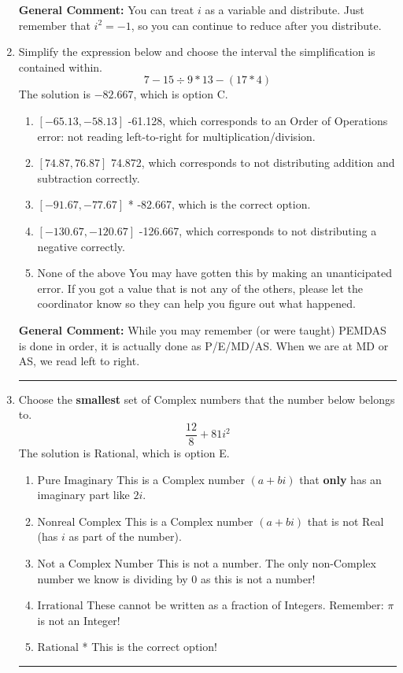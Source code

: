 \documentclass{extbook}[14pt]
\newcommand{\litem}[1]{\item #1

\rule{\textwidth}{0.4pt}}
\begin{document}
\begin{enumerate}
{\textbf{General Comment:} You can treat $i$ as a variable and distribute. Just remember that $i^2=-1$, so you can continue to reduce after you distribute.
}
\litem{
Simplify the expression below and choose the interval the simplification is contained within.
\[ 7 - 15 \div 9 * 13 - (17 * 4) \]
The solution is \( -82.667 \), which is option C.\begin{enumerate}[label=\Alph*.]
\item \( [-65.13, -58.13] \)
 -61.128, which corresponds to an Order of Operations error: not reading left-to-right for multiplication/division.
\item \( [74.87, 76.87] \)
 74.872, which corresponds to not distributing addition and subtraction correctly.
\item \( [-91.67, -77.67] \)
* -82.667, which is the correct option.
\item \( [-130.67, -120.67] \)
 -126.667, which corresponds to not distributing a negative correctly.
\item \( \text{None of the above} \)
 You may have gotten this by making an unanticipated error. If you got a value that is not any of the others, please let the coordinator know so they can help you figure out what happened.
\end{enumerate}

\textbf{General Comment:} While you may remember (or were taught) PEMDAS is done in order, it is actually done as P/E/MD/AS. When we are at MD or AS, we read left to right.
}
\litem{
Choose the \textbf{smallest} set of Complex numbers that the number below belongs to.
\[ \frac{12}{8}+81i^2 \]
The solution is \( \text{Rational} \), which is option E.\begin{enumerate}[label=\Alph*.]
\item \( \text{Pure Imaginary} \)
This is a Complex number $(a+bi)$ that \textbf{only} has an imaginary part like $2i$.
\item \( \text{Nonreal Complex} \)
This is a Complex number $(a+bi)$ that is not Real (has $i$ as part of the number).
\item \( \text{Not a Complex Number} \)
This is not a number. The only non-Complex number we know is dividing by 0 as this is not a number!
\item \( \text{Irrational} \)
These cannot be written as a fraction of Integers. Remember: $\pi$ is not an Integer!
\item \( \text{Rational} \)
* This is the correct option!
\end{enumerate}

}
\end{enumerate}
\end{document}
